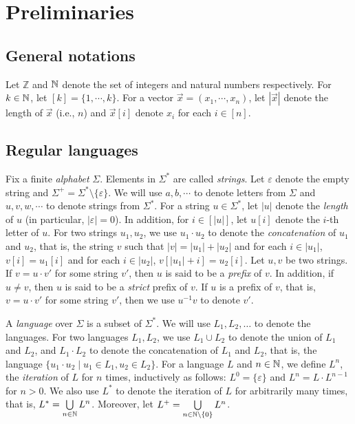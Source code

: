 
\section{Preliminaries}

\subsection*{General notations} 
Let $\mathbb{Z}$ and $\mathbb{N}$ denote the set of integers and natural numbers respectively. For $k \in \mathbb{N}$, let $[k] = \{1,\cdots, k\}$. For a vector $\vec{x}=(x_1,\cdots, x_n)$, let $|\vec{x}|$ denote the length of $\vec{x}$ (i.e., $n$) and  $\vec{x}[i]$ denote $x_i$ for each $i \in [n]$. %


\subsection*{Regular languages}
Fix a finite \emph{alphabet} $\Sigma$. Elements in $\Sigma^*$ are called \emph{strings}. Let $\varepsilon$ denote the empty string and  $\Sigma^+ = \Sigma^* \setminus \{\varepsilon\}$. We will use $a,b,\cdots$ to denote letters from $\Sigma$ and $u, v, w, \cdots$ to denote strings from $\Sigma^*$. For a string $u \in \Sigma^*$, let $|u|$ denote the \emph{length} of $u$ (in particular, $|\varepsilon|=0$). In addition, for $i \in [|u|]$, let $u[i]$ denote the $i$-th letter of $u$. 
For two strings $u_1, u_2$, we use $u_1 \cdot u_2$ to denote the \emph{concatenation} of $u_1$ and $u_2$, that is, the string $v$ such that $|v|= |u_1| + |u_2|$ and for each $i \in |u_1|$, $v[i]= u_1[i]$ and for each $i \in |u_2|$, $v[|u_1|+i]=u_2[i]$. Let $u, v$ be two strings. If $v = u \cdot v'$ for some string $v'$, then $u$ is said to be a \emph{prefix} of $v$. In addition, if $u \neq v$, then $u$ is said to be a \emph{strict} prefix of $v$. If $u$ is a prefix of $v$, that is, $v = u \cdot v'$ for some string $v'$, then 
we use $u^{-1} v$ to denote $v'$. 

A \emph{language} over $\Sigma$ is a subset of $\Sigma^*$. We will use $L_1, L_2, \dots$ to denote the languages. For two languages $L_1, L_2$, we use $L_1 \cup L_2$ to denote the union of $L_1$ and $L_2$, and $L_1 \cdot L_2$ to denote the concatenation of $L_1$ and $L_2$, that is, the language $\{u_1 \cdot u_2 \mid u_1 \in L_1, u_2 \in L_2\}$. For a language $L$ and $n \in \mathbb{N}$, we define $L^n$, the \emph{iteration} of $L$ for $n$ times, inductively as follows: $L^0=\{\varepsilon\}$ and $L^{n} =L \cdot L^{n-1}$ for $n > 0$. We also use $L^*$ to denote the iteration of $L$ for arbitrarily many times, that is, $L^* = \bigcup \limits_{n \in \mathbb{N}} L^n$. Moreover, let $L^+ = \bigcup \limits_{n \in \mathbb{N} \setminus \{0\}} L^n$.

